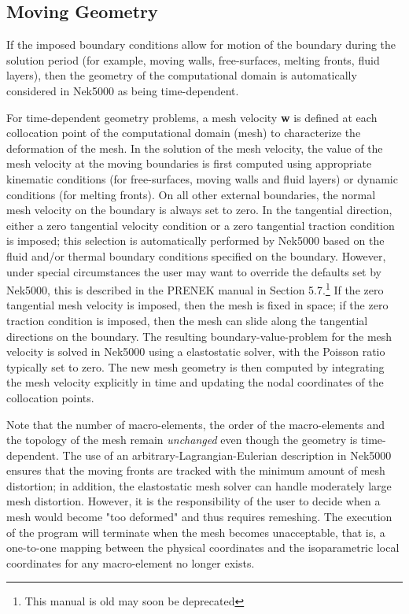 \subsection{Moving Geometry}
If the imposed boundary conditions allow for motion
of the boundary during the solution period (for example,
moving walls, free-surfaces, melting fronts, fluid layers),
then the geometry of the computational domain is automatically
considered in Nek5000 as being time-dependent.

For time-dependent geometry problems,
a mesh velocity {\bf w} is defined at each
collocation point of the computational domain (mesh) to
characterize the deformation of the mesh.
In the solution of the mesh velocity, the value of the mesh
velocity at the moving boundaries is first computed
using appropriate kinematic conditions (for free-surfaces, moving walls
and fluid layers) or dynamic conditions (for melting fronts).
On all other external boundaries, the normal mesh velocity on the
boundary is always set to zero.
In the tangential direction, either a zero tangential velocity
condition or a zero tangential traction condition is imposed; this
selection is automatically performed by Nek5000 based on
the fluid and/or thermal boundary conditions specified
on the boundary.
However, under special circumstances the user may want
to override the defaults set by Nek5000, this is
described in the PRENEK manual in Section 5.7.\footnote{This manual is old may soon be deprecated}
If the zero tangential mesh velocity is imposed, then the mesh
is fixed in space; if the zero traction condition is imposed,
then the mesh can slide along the tangential directions on
the boundary.
The resulting boundary-value-problem for the mesh velocity is solved
in Nek5000 using a elastostatic solver, with the Poisson ratio
typically set to zero.
The new mesh geometry is then computed by integrating the
mesh velocity explicitly in time and updating the nodal coordinates of the
collocation points.

Note that the number of macro-elements, the order of the macro-elements
and the topology of the mesh remain {\em unchanged} even though
the geometry is time-dependent.
The use of an arbitrary-Lagrangian-Eulerian description in Nek5000
ensures that the moving fronts are tracked with the minimum amount
of mesh distortion;
in addition, the elastostatic mesh solver can handle moderately
large mesh distortion.
However, it is the responsibility of the user to decide when
a mesh would become "too deformed" and thus requires remeshing.
The execution of the program will terminate when the mesh becomes
unacceptable, that is, a one-to-one mapping between the physical
coordinates and the isoparametric local coordinates for any
macro-element no longer exists.